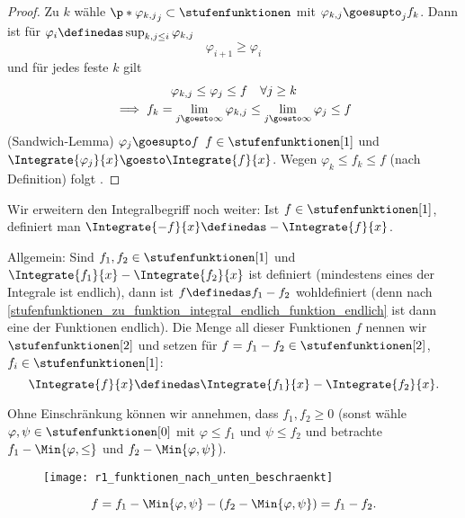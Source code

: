 \begin{proof}
  Zu \( k \) wähle \( \p*{\varphi_{k,j}}_j\subset \stufenfunktionen \) mit \( \varphi_{k,j}\goesupto_{j}f_k \). Dann ist für \( \varphi_i\definedas \sup_{k,j\leq i}\varphi_{k,j} \)
  \begin{equation*}
    \varphi_{i+1}\geq \varphi_i
  \end{equation*}
und für jedes feste \( k \) gilt
\begin{gather*}
  \varphi_{k,j}\leq \varphi_j\leq f \quad \forall j\geq k\\
  \implies f_k=\lim_{j \goesto \infty}\varphi_{k,j}\leq \lim_{j \goesto \infty}\varphi_j\leq f
\end{gather*}
\timplies (Sandwich-Lemma) \( \varphi_j\goesupto f \) \timplies \( f\in \stufenfunktionen[1] \) und \( \Integrate{\varphi_j}{x}\goesto \Integrate{f}{x} \). Wegen \( \varphi_k\leq f_k\leq f \) (nach Definition) folgt \Beh.
\end{proof}
\begin{bemdef}
  Wir erweitern den Integralbegriff noch weiter: Ist \( f\in \stufenfunktionen[1] \), definiert man \( \Integrate{-f}{x}\definedas -\Integrate{f}{x} \).

  Allgemein: Sind \( f_1,f_2\in \stufenfunktionen[1] \) und \( \Integrate{f_1}{x}-\Integrate{f_2}{x} \) ist definiert (\dh mindestens eines der Integrale ist endlich), dann ist \( f\definedas f_1-f_2 \) wohldefiniert (denn nach \ref{stufenfunktionen_zu_funktion_integral_endlich_funktion_endlich} ist dann eine der Funktionen \fue endlich). Die Menge all dieser Funktionen \( f \) nennen wir \( \stufenfunktionen[2] \) und setzen für \( f=f_1-f_2\in \stufenfunktionen[2] \), \( f_i\in \stufenfunktionen[1] \):
  \begin{equation*}
    \Integrate{f}{x}\definedas \Integrate{f_1}{x}-\Integrate{f_2}{x}.
  \end{equation*}
\end{bemdef}
\begin{bemerkung*}
  Ohne Einschränkung können wir annehmen, dass \( f_1,f_2\geq 0 \) (sonst wähle \( \varphi,\psi\in \stufenfunktionen[0] \) mit \( \varphi\leq f_1 \) und \( \psi\leq f_2 \) und betrachte \( f_1-\Min{\varphi,\leq} \) und \( f_2-\Min{\varphi,\psi} \)).
  \begin{figure}[H]
    \centering
    \texttt{[image: r1\_funktionen\_nach\_unten\_beschraenkt]}
    \label{fig:r1_funktionen_nach_unten_beschraenkt}
  \end{figure}
  \begin{equation*}
    f=f_1-\Min{\varphi,\psi}-(f_2-\Min{\varphi,\psi})=f_1-f_2.
  \end{equation*}
\end{bemerkung*}
